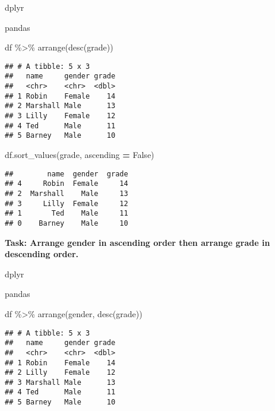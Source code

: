 \documentclass[
]{book}
\newenvironment{Shaded}{\begin{snugshade}}{\end{snugshade}}
\newcommand{\FunctionTok}[1]{\textcolor[rgb]{0.00,0.00,0.00}{#1}}
\newcommand{\NormalTok}[1]{#1}
\newcommand{\OperatorTok}[1]{\textcolor[rgb]{0.81,0.36,0.00}{\textbf{#1}}}
\newcommand{\SpecialCharTok}[1]{\textcolor[rgb]{0.00,0.00,0.00}{#1}}
\newcommand{\StringTok}[1]{\textcolor[rgb]{0.31,0.60,0.02}{#1}}
\newcommand{\VariableTok}[1]{\textcolor[rgb]{0.00,0.00,0.00}{#1}}
\begin{document}
dplyr

pandas

\begin{Shaded}
\begin{Highlighting}[]
\NormalTok{df }\SpecialCharTok{\%\textgreater{}\%} \FunctionTok{arrange}\NormalTok{(}\FunctionTok{desc}\NormalTok{(grade))}
\end{Highlighting}
\end{Shaded}

\begin{verbatim}
## # A tibble: 5 x 3
##   name     gender grade
##   <chr>    <chr>  <dbl>
## 1 Robin    Female    14
## 2 Marshall Male      13
## 3 Lilly    Female    12
## 4 Ted      Male      11
## 5 Barney   Male      10
\end{verbatim}

\begin{Shaded}
\begin{Highlighting}[]
\NormalTok{df.sort\_values(}\StringTok{\textquotesingle{}grade\textquotesingle{}}\NormalTok{, ascending }\OperatorTok{=} \VariableTok{False}\NormalTok{)}
\end{Highlighting}
\end{Shaded}

\begin{verbatim}
##        name  gender  grade
## 4     Robin  Female     14
## 2  Marshall    Male     13
## 3     Lilly  Female     12
## 1       Ted    Male     11
## 0    Barney    Male     10
\end{verbatim}

{\textbf{Task: Arrange gender in ascending order then arrange grade in descending order.
}}

dplyr

pandas

\begin{Shaded}
\begin{Highlighting}[]
\NormalTok{df }\SpecialCharTok{\%\textgreater{}\%}
  \FunctionTok{arrange}\NormalTok{(gender, }\FunctionTok{desc}\NormalTok{(grade))}
\end{Highlighting}
\end{Shaded}

\begin{verbatim}
## # A tibble: 5 x 3
##   name     gender grade
##   <chr>    <chr>  <dbl>
## 1 Robin    Female    14
## 2 Lilly    Female    12
## 3 Marshall Male      13
## 4 Ted      Male      11
## 5 Barney   Male      10
\end{verbatim}
\end{document}
